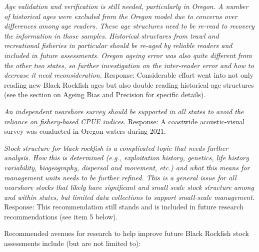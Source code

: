 \documentclass[11pt,
  english,
  letterpaper,
]{article}
\begin{document}
\textit{Age validation and verification is still needed, particularly in Oregon. A number of historical ages were excluded from the Oregon model due to concerns over differences among age readers. These age structures need to be re-read to recovery the information in those samples. Historical structures from trawl and recreational fisheries in particular should be re-aged by reliable readers and included in future assessments. Oregon ageing error was also quite different from the other two states, so further investigation on the inter-reader error and how to decrease it need reconsideration.} Response: Considerable effort went into not only reading new Black Rockfish ages but also double reading historical age structures (see the section on Ageing Bias and Precision for specific details).

\textit{An independent nearshore survey should be supported in all states to avoid the reliance on fishery-based CPUE indices.} Response: A coastwide acoustic-visual survey was conducted in Oregon waters during 2021.

\textit{Stock structure for black rockfish is a complicated topic that needs further analysis. How this is determined (e.g., exploitation history, genetics, life history variability, biogeography, dispersal and movement, etc.) and what this means for management units needs to be further refined. This is a general issue for all nearshore stocks that likely have significant and small scale stock structure among and within states, but limited data collections to support small-scale management.} Response: This recommendation still stands and is included in future research recommendations (see item 5 below).

Recommended avenues for research to help improve future Black Rockfish stock assessments include (but are not limited to):
\end{document}
